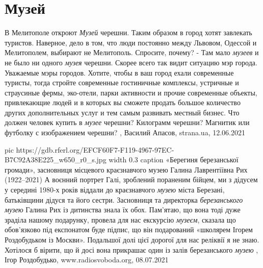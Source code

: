  
 
 
 
 
\chapter{Музей}
\label{sec:slova.muzej}

В Мелитополе откроют \emph{Музей} черешни.  Таким образом в город хотят
завлекать туристов.  Наверное, дело в том, что люди постоянно между Львовом,
Одессой и Мелитополем, выбирают не Мелитополь. Спросите, почему? - Там мало
\emph{музеев} и не было ни одного \emph{музея} черешни. Скорее всего так видит
ситуацию мэр города.  Уважаемые мэры городов. Хотите, чтобы в ваш город ехали
современные туристы, тогда стройте современные гостиничные комплексы, устричные
и страусиные фермы, эко-отели, парки активности и прочие современные объекты,
привлекающие людей и в которых вы сможете продать большое количество других
дополнительных услуг и тем самым развивать местный бизнес.  Что должен человек
купить в \emph{музее} черешни? Килограмм черешни? Магнитик или футболку с
изображением черешни?
, Василий Апасов, strana.ua, 12.06.2021 

\ifcmt
  pic https://gdb.rferl.org/EFCF60F7-F119-4967-97EC-B7C92A38E225_w650_r0_s.jpg
	width 0.3
	caption «Берегиня березанської громади», засновниця місцевого краєзнавчого музею Галина Лаврентіївна Рих (1922–2021)
\fi
А воєнний портрет Галі, зроблений пораненим бійцем, ми з дідусем у середині
1980-х років віддали до краєзнавчого \emph{музею} міста Березані, батьківщини дідуся
та його сестри. Засновниця та директорка \emph{березанського музею} Галина Рих із
дитинства знала їх обох. Пам’ятаю, що вона тоді дуже зраділа нашому подарунку,
провела для нас екскурсію \emph{музеєм}, сказала що обов’язково під експонатом буде
підпис, що він подарований «школярем Ігорем Роздобудьком із Москви». Подальшої
долі цієї дорогої для нас реліквії я не знаю. Хотілося б вірити, що й досі вона
прикрашає один із залів березанського \emph{музею}
, 
Ігор Роздобудько, www.radiosvoboda.org, 08.07.2021
